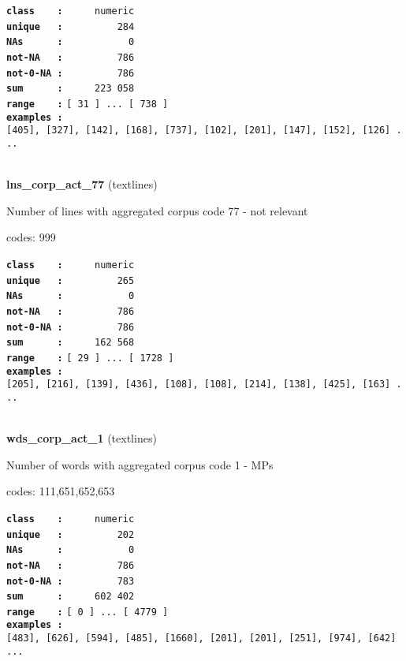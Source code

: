 \documentclass[]{article}
\begin{document}
\textbf{\texttt{class\ \ \ \ :}} \texttt{~~~~~numeric}\\
\textbf{\texttt{unique\ \ \ :}} \texttt{~~~~~~~~~284}\\
\textbf{\texttt{NAs\ \ \ \ \ \ :}} \texttt{~~~~~~~~~~~0}\\
\textbf{\texttt{not-NA\ \ \ :}} \texttt{~~~~~~~~~786}\\
\textbf{\texttt{not-0-NA\ :}} \texttt{~~~~~~~~~786}\\
\textbf{\texttt{sum\ \ \ \ \ \ :}} \texttt{~~~~~223~058}\\
\textbf{\texttt{range\ \ \ \ :}}
\texttt{{[}\ 31\ {]}\ ...\ {[}\ 738\ {]}}\\
\textbf{\texttt{examples\ :}}
\texttt{{[}405{]},\ {[}327{]},\ {[}142{]},\ {[}168{]},\ {[}737{]},\ {[}102{]},\ {[}201{]},\ {[}147{]},\ {[}152{]},\ {[}126{]}\ ...}\\

~

\textbf{lns\_corp\_act\_77} (textlines)

Number of lines with aggregated corpus code 77 - not relevant

codes: 999

\textbf{\texttt{class\ \ \ \ :}} \texttt{~~~~~numeric}\\
\textbf{\texttt{unique\ \ \ :}} \texttt{~~~~~~~~~265}\\
\textbf{\texttt{NAs\ \ \ \ \ \ :}} \texttt{~~~~~~~~~~~0}\\
\textbf{\texttt{not-NA\ \ \ :}} \texttt{~~~~~~~~~786}\\
\textbf{\texttt{not-0-NA\ :}} \texttt{~~~~~~~~~786}\\
\textbf{\texttt{sum\ \ \ \ \ \ :}} \texttt{~~~~~162~568}\\
\textbf{\texttt{range\ \ \ \ :}}
\texttt{{[}\ 29\ {]}\ ...\ {[}\ 1728\ {]}}\\
\textbf{\texttt{examples\ :}}
\texttt{{[}205{]},\ {[}216{]},\ {[}139{]},\ {[}436{]},\ {[}108{]},\ {[}108{]},\ {[}214{]},\ {[}138{]},\ {[}425{]},\ {[}163{]}\ ...}\\

~

\textbf{wds\_corp\_act\_1} (textlines)

Number of words with aggregated corpus code 1 - MPs

codes: 111,651,652,653

\textbf{\texttt{class\ \ \ \ :}} \texttt{~~~~~numeric}\\
\textbf{\texttt{unique\ \ \ :}} \texttt{~~~~~~~~~202}\\
\textbf{\texttt{NAs\ \ \ \ \ \ :}} \texttt{~~~~~~~~~~~0}\\
\textbf{\texttt{not-NA\ \ \ :}} \texttt{~~~~~~~~~786}\\
\textbf{\texttt{not-0-NA\ :}} \texttt{~~~~~~~~~783}\\
\textbf{\texttt{sum\ \ \ \ \ \ :}} \texttt{~~~~~602~402}\\
\textbf{\texttt{range\ \ \ \ :}}
\texttt{{[}\ 0\ {]}\ ...\ {[}\ 4779\ {]}}\\
\textbf{\texttt{examples\ :}}
\texttt{{[}483{]},\ {[}626{]},\ {[}594{]},\ {[}485{]},\ {[}1660{]},\ {[}201{]},\ {[}201{]},\ {[}251{]},\ {[}974{]},\ {[}642{]}\ ...}\\
\end{document}
